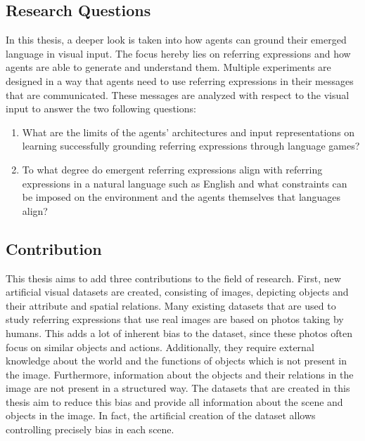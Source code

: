 \subsection{Research Questions}
In this thesis, a deeper look is taken into how agents can ground their emerged language in visual input.
The focus hereby lies on referring expressions and how agents are able to generate and understand them.
Multiple experiments are designed in a way that agents need to use referring expressions in their messages that are communicated.
These messages are analyzed with respect to the visual input to answer the two following questions:
\begin{enumerate}
      \item What are the limits of the agents' architectures and input representations on learning successfully grounding referring expressions through language games?
      \item To what degree do emergent referring expressions align with referring expressions in a natural language such as English and what constraints can be imposed on the environment and the agents themselves that languages align?
\end{enumerate}


\subsection{Contribution}
This thesis aims to add three contributions to the field of research.
First, new artificial visual datasets are created, consisting of images, depicting objects and their attribute and spatial relations.
Many existing datasets that are used to study referring expressions that use real images are based on photos taking by humans.
This adds a lot of inherent bias to the dataset, since these photos often focus on similar objects and actions.
Additionally, they require external knowledge about the world and the functions of objects which is not present in the image.
Furthermore, information about the objects and their relations in the image are not present in a structured way.
The datasets that are created in this thesis aim to reduce this bias and provide all information about the scene and objects in the image.
In fact, the artificial creation of the dataset allows controlling precisely bias in each scene.

